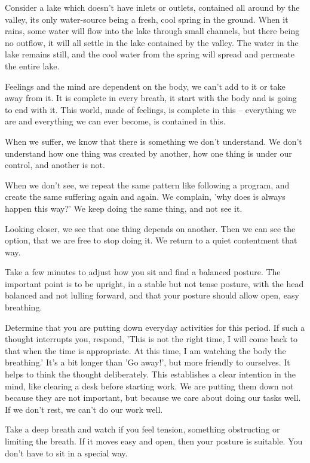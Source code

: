 Consider a lake which doesn't have inlets or outlets, contained all
around by the valley, its only water-source being a fresh, cool spring
in the ground. When it rains, some water will flow into the lake through
small channels, but there being no outflow, it will all settle in the
lake contained by the valley. The water in the lake remains still, and
the cool water from the spring will spread and permeate the entire lake.

Feelings and the mind are dependent on the body, we can't add to it or
take away from it. It is complete in every breath, it start with the
body and is going to end with it. This world, made of feelings, is
complete in this -- everything we are and everything we can ever become,
is contained in this.

When we suffer, we know that there is something we don't understand. We
don't understand how one thing was created by another, how one thing is
under our control, and another is not.

When we don't see, we repeat the same pattern like following a program,
and create the same suffering again and again. We complain, 'why does is
always happen this way?' We keep doing the same thing, and not see it.

Looking closer, we see that one thing depends on another. Then we can
see the option, that we are free to stop doing it. We return to a quiet
contentment that way.

Take a few minutes to adjust how you sit and find a balanced posture.
The important point is to be upright, in a stable but not tense posture,
with the head balanced and not lulling forward, and that your posture
should allow open, easy breathing.

Determine that you are putting down everyday activities for this period.
If such a thought interrupts you, respond, 'This is not the right time,
I will come back to that when the time is appropriate. At this time, I
am watching the body the breathing.' It's a bit longer than 'Go away!',
but more friendly to ourselves. It helps to think the thought
deliberately. This establishes a clear intention in the mind, like
clearing a desk before starting work. We are putting them down not
because they are not important, but because we care about doing our
tasks well. If we don't rest, we can't do our work well.

Take a deep breath and watch if you feel tension, something obstructing
or limiting the breath. If it moves easy and open, then your posture is
suitable. You don't have to sit in a special way.

